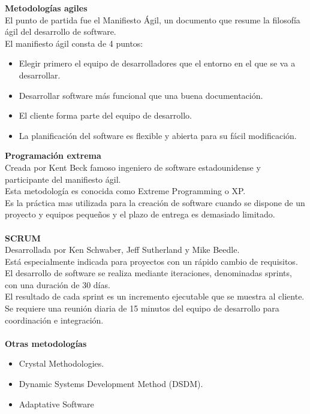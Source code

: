 \documentclass[12pt,twoside]{article}
\begin{document}
\textbf{Metodologías agiles}\\
El punto de partida fue el Manifiesto Ágil, un documento que resume la filosofía ágil 
del desarrollo de software.\\
El manifiesto ágil consta de 4 puntos:
\begin{itemize}
    \item Elegir primero el equipo de desarrolladores que el entorno en el que se va 
    a desarrollar.
    \item Desarrollar software más funcional que una buena documentación.
    \item El cliente forma parte del equipo de desarrollo.
    \item La planificación del software es flexible y abierta para su fácil 
    modificación.
\end{itemize}
\textbf{Programación extrema}\\
Creada por Kent Beck famoso ingeniero de software estadounidense y participante del 
manifiesto ágil.\\
Esta metodología es conocida como Extreme Programming o XP.\\
Es la práctica mas utilizada para la creación de software cuando se dispone de un 
proyecto y equipos pequeños y el plazo de entrega es demasiado limitado.\\ \\
\textbf{SCRUM}\\
Desarrollada por Ken Schwaber, Jeff Sutherland y Mike Beedle.\\
Está especialmente indicada para proyectos con un rápido cambio de requisitos.\\
El desarrollo de software se realiza mediante iteraciones, denominadas sprints, con 
una duración de 30 días.\\
El resultado de cada sprint es un incremento ejecutable que se muestra al cliente.\\
Se requiere una reunión diaria de 15 minutos del equipo de desarrollo para 
coordinación e integración.\\ \\
\textbf{Otras metodologías}
\begin{itemize}
    \item Crystal Methodologies.
    \item Dynamic Systems Development Method (DSDM).
    \item Adaptative Software
\end{itemize}




\end{document}
